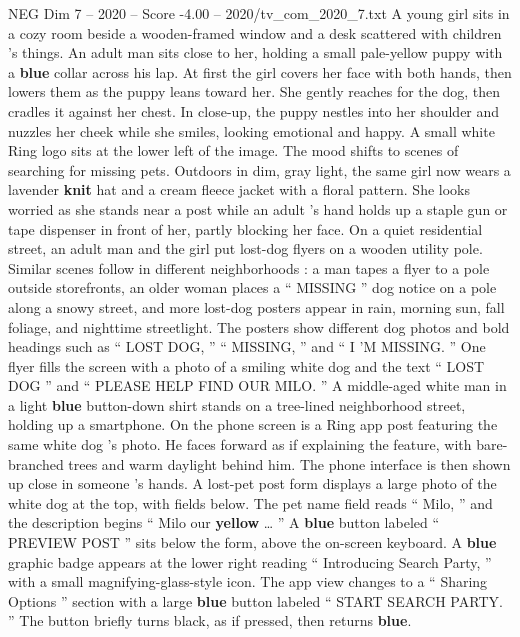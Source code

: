 \begin{textsample}{NEG Dim 7 – 2020 – Score -4.00 – 2020/tv\_com\_2020\_7.txt}  \label{ex:f7_neg_012}
A young girl sits in a cozy room beside a wooden-framed window and a desk scattered with children ’s things.
An adult man sits close to her, holding a small pale-yellow puppy with a \textbf{blue} collar across his lap.
At first the girl covers her face with both hands, then lowers them as the puppy leans toward her.
She gently reaches for the dog, then cradles it against her chest.
In close-up, the puppy nestles into her shoulder and nuzzles her cheek while she smiles, looking emotional and happy.
A small white Ring logo sits at the lower left of the image.
The mood shifts to scenes of searching for missing pets.
Outdoors in dim, gray light, the same girl now wears a lavender \textbf{knit} hat and a cream fleece jacket with a floral pattern.
She looks worried as she stands near a post while an adult ’s hand holds up a staple gun or tape dispenser in front of her, partly blocking her face.
On a quiet residential street, an adult man and the girl put lost-dog flyers on a wooden utility pole.
Similar scenes follow in different neighborhoods : a man tapes a flyer to a pole outside storefronts, an older woman places a “ MISSING ” dog notice on a pole along a snowy street, and more lost-dog posters appear in rain, morning sun, fall foliage, and nighttime streetlight.
The posters show different dog photos and bold headings such as “ LOST DOG, ” “ MISSING, ” and “ I ’M MISSING. ” One flyer fills the screen with a photo of a smiling white dog and the text “ LOST DOG ” and “ PLEASE HELP FIND OUR MILO. ” A middle-aged white man in a light \textbf{blue} button-down shirt stands on a tree-lined neighborhood street, holding up a smartphone.
On the phone screen is a Ring app post featuring the same white dog ’s photo.
He faces forward as if explaining the feature, with bare-branched trees and warm daylight behind him.
The phone interface is then shown up close in someone ’s hands.
A lost-pet post form displays a large photo of the white dog at the top, with fields below.
The pet name field reads “ Milo, ” and the description begins “ Milo our \textbf{yellow} … ” A \textbf{blue} button labeled “ PREVIEW POST ” sits below the form, above the on-screen keyboard.
A \textbf{blue} graphic badge appears at the lower right reading “ Introducing Search Party, ” with a small magnifying-glass-style icon.
The app view changes to a “ Sharing Options ” section with a large \textbf{blue} button labeled “ START SEARCH PARTY. ” The button briefly turns black, as if pressed, then returns \textbf{blue}.

\end{textsample}
